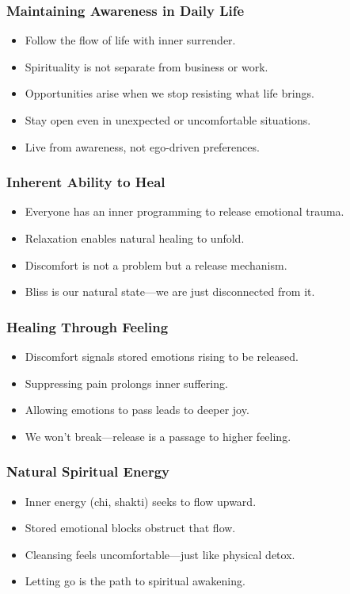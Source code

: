 \begin{frame}[fragile]\frametitle{Maintaining Awareness in Daily Life}
    \begin{itemize}
        \item Follow the flow of life with inner surrender.
        \item Spirituality is not separate from business or work.
        \item Opportunities arise when we stop resisting what life brings.
        \item Stay open even in unexpected or uncomfortable situations.
        \item Live from awareness, not ego-driven preferences.
    \end{itemize}
\end{frame}


\begin{frame}[fragile]\frametitle{Inherent Ability to Heal}
  \begin{itemize}
    \item Everyone has an inner programming to release emotional trauma.
    \item Relaxation enables natural healing to unfold.
    \item Discomfort is not a problem but a release mechanism.
    \item Bliss is our natural state—we are just disconnected from it.
  \end{itemize}
\end{frame}

\begin{frame}[fragile]\frametitle{Healing Through Feeling}
  \begin{itemize}
    \item Discomfort signals stored emotions rising to be released.
    \item Suppressing pain prolongs inner suffering.
    \item Allowing emotions to pass leads to deeper joy.
    \item We won't break—release is a passage to higher feeling.
  \end{itemize}
\end{frame}

\begin{frame}[fragile]\frametitle{Natural Spiritual Energy}
  \begin{itemize}
    \item Inner energy (chi, shakti) seeks to flow upward.
    \item Stored emotional blocks obstruct that flow.
    \item Cleansing feels uncomfortable—just like physical detox.
    \item Letting go is the path to spiritual awakening.
  \end{itemize}
\end{frame}

